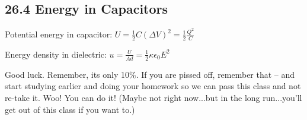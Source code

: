 \documentclass[twocolumn]{article}
\newenvironment{small_item}{
\begin{itemize}
  \setlength{\itemsep}{.25pt}
  \setlength{\parskip}{0pt}
  \setlength{\parsep}{0pt}
}{\end{itemize}}
\begin{document}
	
	\subsection*{26.4 Energy in Capacitors} %
	\label{sub:26_4_energy_in_capacitors}
	
	\begin{small_item}
		\item Potential energy in capacitor: $U = \frac{1}{2}C(\Delta V)^2 = \frac{1}{2}\frac{Q^2}{C}$
		\item Energy density in dielectric: $u = \frac{U}{Ad} = \frac{1}{2}\kappa\epsilon_0E^2$
		\item Good luck.  Remember, its only 10\%.  If you are pissed off, remember that -- and start studying earlier and doing your homework so we can pass this class and not re-take it.  Woo!  You can do it!  (Maybe not right now...but in the long run...you'll get out of this class if you want to.)
	\end{small_item}
	
	
	
\end{document}

